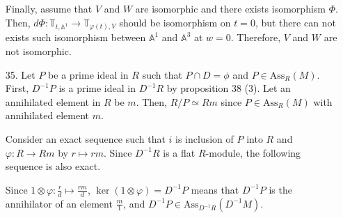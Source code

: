 \documentclass[12pt]{article}
\begin{document}
\begin{enumerate}
Finally, assume that $V$ and $W$ are isomorphic and there exists isomorphism $\Phi$. Then, $d\Phi:\mathbb{T}_{t, \mathbb{A}^1}\rightarrow \mathbb{T}_{\varphi(t),V}$ should be isomorphism on $t=0$, but there can not exists such isomorphism between $\mathbb{A}^1$ and $\mathbb{A}^3$ at $w=0$. Therefore, $V$ and $W$ are not isomorphic.
\newpage
\item[35.] Let $P$ be a prime ideal in $R$ such that $P\cap D=\phi$ and $P\in \text{Ass}_R(M)$. First, $D^{-1}P$ is a prime ideal in $D^{-1}R$ by proposition 38 (3). Let an annihilated element in $R$ be $m$. Then, $R/P \simeq Rm$ since $P\in \text{Ass}_R(M)$ with annihilated element $m$.

Consider an exact sequence such that $i$ is inclusion of $P$ into $R$ and $\varphi:R\rightarrow Rm$ by $r\mapsto rm$. Since $D^{-1}R$ is a flat $R$-module, the following sequence is also exact.
\begin{figure}[!h]
\centering
{}
\end{figure}
\begin{figure}[!h]
\centering
{}
\end{figure}

Since $1\otimes \varphi: \frac{r}{d}\mapsto \frac{rm}{d}$, $\ker (1\otimes \varphi)=D^{-1}P$ means that $D^{-1}P$ is the annihilator of an element $\frac{m}{1}$, and $D^{-1}P\in \text{Ass}_{D^{-1}R}(D^{-1}M)$.
\end{enumerate}
\end{document}
